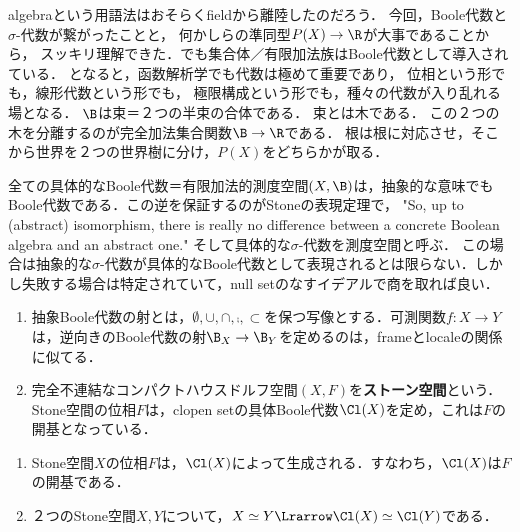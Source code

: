 \documentclass[uplatex, dvipdfmx]{jsreport}
\begin{document}
\begin{discussion}[algebra]
    algebraという用語法はおそらくfieldから離陸したのだろう．
    今回，Boole代数と$\sigma$-代数が繋がったことと，
    何かしらの準同型$P(X)\to\R$が大事であることから，
    スッキリ理解できた．\cite{Tao11-MeasureTheory}でも集合体／有限加法族はBoole代数として導入されている．
    となると，函数解析学でも代数は極めて重要であり，
    位相という形でも，線形代数という形でも，
    極限構成という形でも，種々の代数が入り乱れる場となる．
    $\B$は束＝２つの半束の合体である．
    束とは木である．
    この２つの木を分離するのが完全加法集合関数$\B\to\R$である．
    根は根に対応させ，そこから世界を２つの世界樹に分け，$P(X)$をどちらかが取る．
\end{discussion}

\begin{discussion}
    全ての具体的なBoole代数＝有限加法的測度空間$(X,\B)$は，抽象的な意味でもBoole代数である．この逆を保証するのがStoneの表現定理で，
    "So, up to (abstract) isomorphism, there is really no difference between a concrete Boolean algebra and an abstract one."\cite{Tao11-MeasureTheory}
    そして具体的な$\sigma$-代数を測度空間と呼ぶ．
    この場合は抽象的な$\sigma$-代数が具体的なBoole代数として表現されるとは限らない．しかし失敗する場合は特定されていて，null setのなすイデアルで商を取れば良い．
\end{discussion}

\begin{definition}\mbox{}
    \begin{enumerate}
        \item 抽象Boole代数の射とは，$\emptyset,\cup,\cap,\comp,\subset$を保つ写像とする．可測関数$f:X\to Y$は，逆向きのBoole代数の射$\B_X\to\B_Y$を定めるのは，frameとlocaleの関係に似てる．
        \item 完全不連結なコンパクトハウスドルフ空間$(X,F)$を\textbf{ストーン空間}という．Stone空間の位相$F$は，clopen setの具体Boole代数$\Cl(X)$を定め，これは$F$の開基となっている．
    \end{enumerate}
\end{definition}

\begin{lemma}\mbox{}
    \begin{enumerate}
        \item Stone空間$X$の位相$F$は，$\Cl(X)$によって生成される．すなわち，$\Cl(X)$は$F$の開基である．
        \item ２つのStone空間$X,Y$について，$X\simeq Y\Lrarrow\Cl(X)\simeq\Cl(Y)$である．
    \end{enumerate}
\end{lemma}
\end{document}

